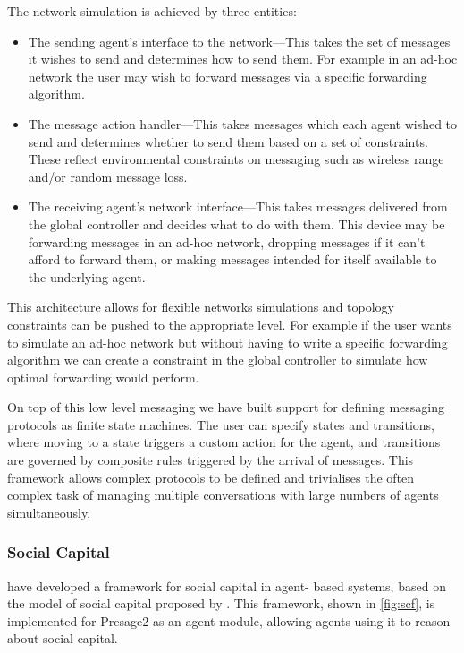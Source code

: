 The network simulation is achieved by three entities:
\begin{itemize}
	\item The sending agent's interface to the network---This takes the set
	of messages it wishes to send and determines how to send them. For
	example in an ad-hoc network the user may wish to forward messages
	via a specific forwarding algorithm. 
	\item The message action handler---This takes messages which each agent
	wished to send and determines whether to send them based on a set
	of constraints. These reflect environmental constraints on messaging
	such as wireless range and/or random message loss.
	\item The receiving agent's network interface---This takes messages delivered
	from the global controller and decides what to do with them. This
	device may be forwarding messages in an ad-hoc network, dropping messages
	if it can't afford to forward them, or making messages intended for
	itself available to the underlying agent.
\end{itemize}

This architecture allows for flexible networks simulations and topology
constraints can be pushed to the appropriate level. For example if the user
wants to simulate an ad-hoc network but without having to write a specific
forwarding algorithm we can create a constraint in the global controller to
simulate how optimal forwarding would perform.

On top of this low level messaging we have built support for defining
messaging protocols as finite state machines. The user can specify
states and transitions, where moving to a state triggers a custom
action for the agent, and transitions are governed by composite rules
triggered by the arrival of messages. This framework allows complex
protocols to be defined and trivialises the often complex task of
managing multiple conversations with large numbers of agents simultaneously.

\subsubsection*{Social Capital}

\citet{Petruzzi2014} have developed a framework for social capital in agent-
based systems, based on the model of social capital proposed by
\citet{ostromahn2003}. This framework, shown in \autoref{fig:scf}, is
implemented for Presage2 as an agent module, allowing agents using it to
reason about social capital.

